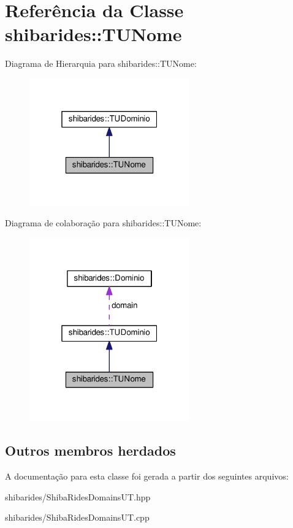 \hypertarget{classshibarides_1_1TUNome}{}\section{Referência da Classe shibarides\+:\+:T\+U\+Nome}
\label{classshibarides_1_1TUNome}


Diagrama de Hierarquia para shibarides\+:\+:T\+U\+Nome\+:\nopagebreak
\begin{figure}[H]
\begin{center}
\leavevmode
\includegraphics[width=196pt]{classshibarides_1_1TUNome__inherit__graph}
\end{center}
\end{figure}


Diagrama de colaboração para shibarides\+:\+:T\+U\+Nome\+:\nopagebreak
\begin{figure}[H]
\begin{center}
\leavevmode
\includegraphics[width=196pt]{classshibarides_1_1TUNome__coll__graph}
\end{center}
\end{figure}
\subsection*{Outros membros herdados}


A documentação para esta classe foi gerada a partir dos seguintes arquivos\+:\begin{DoxyCompactItemize}
\item 
shibarides/Shiba\+Rides\+Domains\+U\+T.\+hpp\item 
shibarides/Shiba\+Rides\+Domains\+U\+T.\+cpp\end{DoxyCompactItemize}
